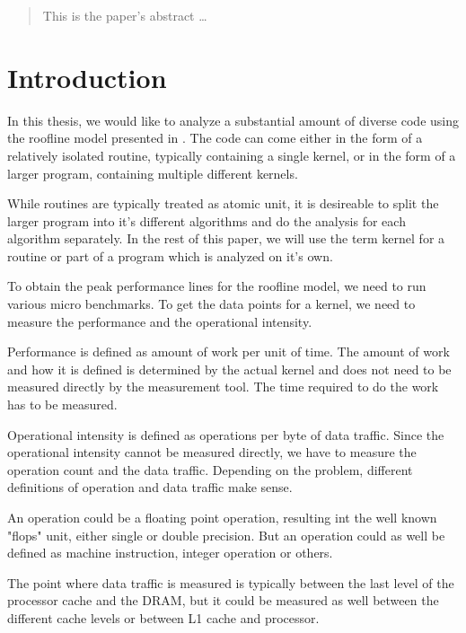 \documentclass[a4paper,12pt]{article}
\begin{document}
\maketitle

\begin{abstract}
This is the paper's abstract \ldots
\end{abstract}

\tableofcontents

\section{Introduction}
In this thesis, we would like to analyze a substantial amount of diverse code using the roofline model presented in \cite{Roofline}. The code can come either in the form of a relatively isolated routine, typically containing a single kernel, or in the form of a larger program, containing multiple different kernels.

While routines are typically treated as atomic unit, it is desireable to split the larger program into it's different algorithms and do the analysis for each algorithm separately. In the rest of this paper, we will use the term kernel for a routine or part of a program which is analyzed on it's own.

To obtain the peak performance lines for the roofline model, we need to run various micro benchmarks. To get the data points for a kernel, we need to measure the performance and the operational intensity. 

Performance is defined as amount of work per unit of time. The amount of work and how it is defined is determined by the actual kernel and does not need to be measured directly by the measurement tool. The time required to do the work has to be measured.

Operational intensity is defined as operations per byte of data traffic. Since the operational intensity cannot be measured directly, we have to measure the operation count and the data traffic. Depending on the problem, different definitions of operation and data traffic make sense.

An operation could be a floating point operation, resulting int the well known "flops" unit, either single or double precision. But an operation could as well be defined as machine instruction, integer operation or others.

The point where data traffic is measured is typically between the last level of the processor cache and the DRAM, but it could be measured as well between the different cache levels or between L1 cache and processor.
\end{document}

